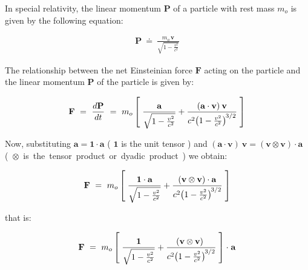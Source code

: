 \documentclass[10pt,fleqn]{article}
\begin{document}
\noindent In special relativity, the linear momentum $\mathbf{P}$ of a particle with rest mass $m_o$ is given by the following equation:
\par \vspace{-0.30em}
\begin{eqnarray*}
\mathbf{P} ~\doteq~ \frac{m_o \, \mathbf{v}}{\sqrt{1 - \frac{v^2}{c^2}}}
\end{eqnarray*}
\par \vspace{+0.60em}
\noindent The relationship between the net Einsteinian force $\mathbf{F}$ acting on the particle and the linear momentum $\mathbf{P}$ of the particle is given by:
\par \vspace{-0.30em}
\begin{eqnarray*}
\mathbf{F} ~=~ \frac{d\mathbf{P}}{d{t}} ~=~ m_o \left [ \; \frac{\mathbf{a}}{\sqrt{1 - \frac{v^2}{c^2}}} + \frac{(\mathbf{a} \cdot \mathbf{v}) \: \mathbf{v}}{c^2\hspace{-0.18em}\left(1 - \frac{v^2}{c^2}\right)^{\hspace{-0.09em}{3/2}}} \; \right ]
\end{eqnarray*}
\par \vspace{+0.60em}
\noindent Now, substituting $\mathbf{a} = \mathbf{1} \cdot \mathbf{a}$ ( $\mathbf{1}$ is the unit tensor ) and $( \mathbf{a} \cdot \mathbf{v} ) \: \mathbf{v} = ( \mathbf{v} \otimes \mathbf{v} ) \cdot \mathbf{a}$ \hbox {( $\otimes$ is the tensor product or dyadic product )} we obtain:
\par \vspace{-0.30em}
\begin{eqnarray*}
\mathbf{F} ~=~ m_o \left [ \; \frac{\mathbf{1} \cdot \mathbf{a}}{\sqrt{1 - \frac{v^2}{c^2}}} + \frac{( \mathbf{v} \otimes \mathbf{v} ) \cdot \mathbf{a}}{c^2\hspace{-0.18em}\left(1 - \frac{v^2}{c^2}\right)^{\hspace{-0.09em}{3/2}}} \; \right ]
\end{eqnarray*}
\par \vspace{+0.60em}
\noindent that is:
\par \vspace{-0.30em}
\begin{eqnarray*}
\mathbf{F} ~=~ m_o \left [ \; \frac{\mathbf{1}}{\sqrt{1 - \frac{v^2}{c^2}}} + \frac{\hspace{-0.33em}( \mathbf{v} \otimes \mathbf{v} )}{c^2\hspace{-0.18em}\left(1 - \frac{v^2}{c^2}\right)^{\hspace{-0.09em}{3/2}}} \; \right ] \cdot \hspace{+0.06em}\mathbf{a}
\end{eqnarray*}
\end{document}
